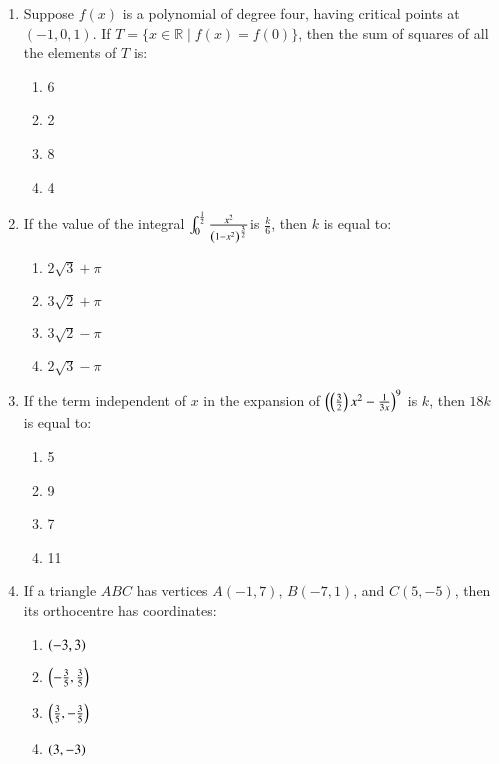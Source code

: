 \documentclass[journal,9pt,twocolumn]{IEEEtran}
\begin{document}
\begin{enumerate}
\item Suppose $f(x)$ is a polynomial of degree four, having critical points at $(-1, 0, 1)$. If $T = \{ x \in \mathbb{R} \mid f(x) = f(0) \}$, then the sum of squares of all the elements of $T$ is:
        \begin{multicols}{4}

\begin{enumerate}
    \item 6
    \item 2
    \item 8
    \item 4
\end{enumerate}
\end{multicols}

\item If the value of the integral $ \int_{0}^{\frac{1}{2}} \frac{x^2}{\left(1 - x^2\right)^{\frac{3}{2}}}$is $\frac{k}{6}$, then $k$ is equal to:
        
        \begin{multicols}{2}
\begin{enumerate}
    \item $2\sqrt{3} + \pi$
    \item $3\sqrt{2} + \pi$
    \item $3\sqrt{2} - \pi$
    \item $2\sqrt{3} - \pi$
\end{enumerate}
\end{multicols}

 \item If the term independent of $x$ in the expansion of $\left( \left( \frac{3}{2} \right) x^2 - \frac{1}{3x} \right)^9$ is $k$, then $18k$ is equal to:
        \begin{multicols}{4}

\begin{enumerate}
    \item 5
    \item 9
    \item 7
    \item 11
\end{enumerate}
\end{multicols}

\item If a triangle $ABC$ has vertices $A(-1, 7)$, $B(-7, 1)$, and $C(5, -5)$, then its orthocentre has coordinates:
        \begin{multicols}{2}

\begin{enumerate}
    \item $\left(-3, 3\right)$
    \item $\left(-\frac{3}{5}, \frac{3}{5}\right)$
    \item $\left(\frac{3}{5}, -\frac{3}{5}\right)$
    \item $\left(3, -3\right)$
\end{enumerate}
\end{multicols}


\end{enumerate}
\end{document}
